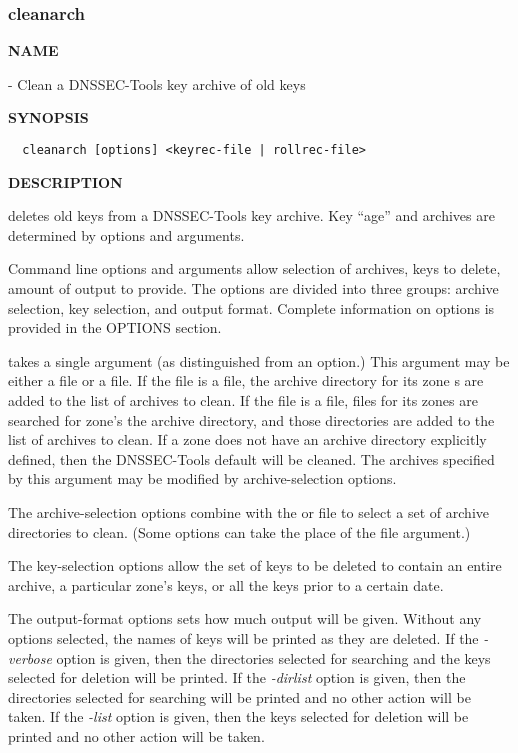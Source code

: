 \clearpage

\subsubsection{cleanarch}

{\bf NAME}

 - Clean a DNSSEC-Tools key archive of old keys

{\bf SYNOPSIS}

\begin{verbatim}
  cleanarch [options] <keyrec-file | rollrec-file>
\end{verbatim}

{\bf DESCRIPTION}

 deletes old keys from a DNSSEC-Tools key archive.  Key ``age''
and archives are determined by options and arguments.

Command line options and arguments allow selection of archives, keys to
delete, amount of output to provide.  The options are divided into three
groups:  archive selection, key selection, and output format.  Complete
information on options is provided in the OPTIONS section.

 takes a single argument (as distinguished from an option.)
This argument may be either a  file or a  file.
If the file is a  file, the archive directory for its zone
s are added to the list of archives to clean.  If the file is a
 file,  files for its zones are searched for
zone's the archive directory, and those directories are added to the list of
archives to clean.  If a zone does not have an archive directory explicitly
defined, then the DNSSEC-Tools default will be cleaned.  The archives
specified by this argument may be modified by archive-selection options.

The archive-selection options combine with the  or
 file to select a set of archive directories to clean.
(Some options can take the place of the file argument.)

The key-selection options allow the set of keys to be deleted to contain an
entire archive, a particular zone's keys, or all the keys prior to a certain
date.

The output-format options sets how much output will be given.  Without any
options selected, the names of keys will be printed as they are deleted.  If
the {\it -verbose} option is given, then the directories selected for
searching and the keys selected for deletion will be printed.  If the {\it
-dirlist} option is given, then the directories selected for searching will be
printed and no other action will be taken.  If the {\it -list} option is
given, then the keys selected for deletion will be printed and no other action
will be taken.

